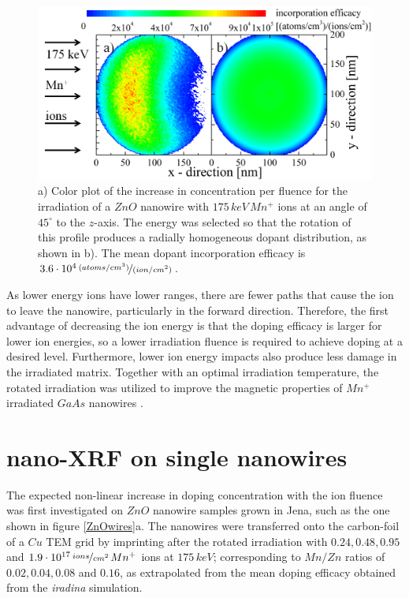 \begin{figure}
	\centering
		\includegraphics[width=.8\textwidth]{images/iradinacrosssection.png}
	\caption{a) Color plot of the increase in concentration per fluence for the irradiation of a $ZnO$ nanowire with $175\,keV\,Mn^+$ ions at an angle of $45^\circ$ to the $z$-axis. The energy was selected so that the rotation of this profile produces a radially homogeneous dopant distribution, as shown in b). The mean dopant incorporation efficacy is $3.6\cdot10^4\,\nicefrac{(atoms/cm^3)}{(ion/cm^2)}$.}
	\label{iradinacrossection}
\end{figure} 

As lower energy ions have lower ranges, there are fewer paths that cause the ion to leave the nanowire, particularly in the forward direction. Therefore, the first advantage of decreasing the ion energy is that the doping efficacy is larger for lower ion energies, so a lower irradiation fluence is required to achieve doping at a desired level. Furthermore, lower ion energy impacts also produce less damage in the irradiated matrix. Together with an optimal irradiation temperature, the rotated irradiation was utilized to improve the magnetic properties of $Mn^+$ irradiated $GaAs$ nanowires \cite{borschel_new_2011,paschoal_hopping_2012,borschel_ion-solid_2012,kumar_magnetic_2013,paschoal_magnetoresistance_2014}. 



\vfill
\section{nano-XRF on single nanowires}

The expected non-linear increase in doping concentration with the ion fluence was first investigated on $ZnO$ nanowire samples grown in Jena, such as the one shown in figure \ref{ZnOwires}a. The nanowires were transferred onto the carbon-foil of a $Cu$ TEM grid by imprinting after the rotated irradiation with $0.24, 0.48, 0.95$ and $1.9\cdot 10^{17}\,\nicefrac{ions}{cm^2}\,Mn^+$ ions at $175\,keV$; corresponding to $Mn/Zn$ ratios of $0.02, 0.04, 0.08$ and $0.16$, as extrapolated from the mean doping efficacy obtained from the \emph{iradina} simulation.


